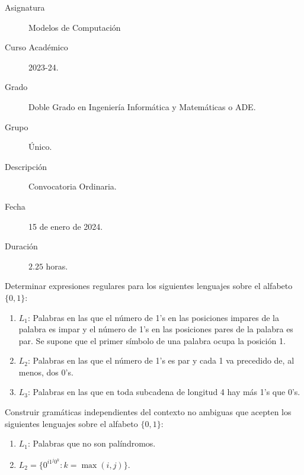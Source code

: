 \documentclass[12pt]{article}
\begin{document}

    
    

    \begin{description}
        \item[Asignatura] Modelos de Computación
        \item[Curso Académico] 2023-24.
        \item[Grado] Doble Grado en Ingeniería Informática y Matemáticas o ADE.
        \item[Grupo] Único.
        \item[Descripción] Convocatoria Ordinaria.
        \item[Fecha] 15 de enero de 2024.
        \item[Duración] $2.25$ horas.    
    \end{description}
    \newpage

    \begin{ejercicio}[2.5 puntos]
        Determinar expresiones regulares para los siguientes lenguajes sobre el alfabeto $\{0, 1\}$:
        \begin{enumerate}
            \item $L_1$: Palabras en las que el número de 1's en las posiciones impares de la palabra es impar y el número de 1's en las posiciones pares de la palabra es par. Se supone que el primer símbolo de una palabra ocupa la posición 1.
            \item $L_2$: Palabras en las que el número de 1's es par y cada 1 va precedido de, al menos, dos 0's.
            \item $L_3$: Palabras en las que en toda subcadena de longitud 4 hay más 1's que 0's.
        \end{enumerate}
    \end{ejercicio}

    \begin{ejercicio}[2.5 puntos]
        Construir gramáticas independientes del contexto no ambiguas que acepten los siguientes lenguajes sobre el alfabeto $\{0, 1\}$:
        \begin{enumerate}
            \item $L_1$: Palabras que no son palíndromos.
            \item $L_2 = \{0^{i1^j0^k} : k = \max(i, j)\}$.
        \end{enumerate}
    \end{ejercicio}
\end{document}
